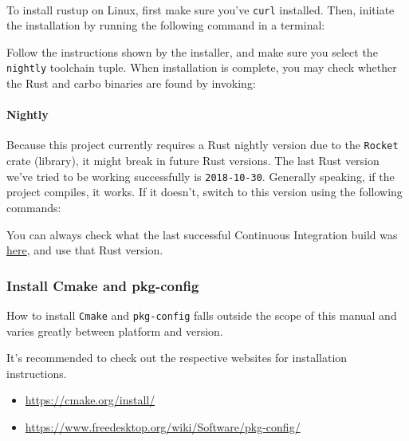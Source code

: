 \documentclass{standalone}
\begin{document}
  \paragraph{}
  To install rustup on Linux, first make sure you've \verb_curl_ installed.
  Then, initiate the installation by running the following command in a
  terminal:
  
  Follow the instructions shown by the installer, and make sure you select the
  \verb_nightly_ toolchain tuple. When installation is complete, you may check
  whether the Rust and carbo binaries are found by invoking:
  

  \paragraph{Nightly}
  Because this project currently requires a Rust nightly version due to the
  \verb_Rocket_ crate (library), it might break in future Rust versions. The
  last Rust version we've tried to be working successfully is
  \verb_2018-10-30_. Generally speaking, if the project compiles, it works. If
  it doesn't, switch to this version using the following commands:

  

  You can always check what the last successful Continuous Integration build
  was \href{https://gitlab.com/timvisee/cant-touch-this/pipelines}{here},
  and use that Rust version.

  \subsubsection{Install Cmake and pkg-config}
  How to install \verb_Cmake_ and \verb_pkg-config_ falls outside the scope of
  this manual and varies greatly between platform and version.

  It's recommended to check out the respective websites for installation
  instructions.
  \begin{itemize}
    \tightlist{}
    \item \url{https://cmake.org/install/}
    \item \url{https://www.freedesktop.org/wiki/Software/pkg-config/}
  \end{itemize}
\end{document}
